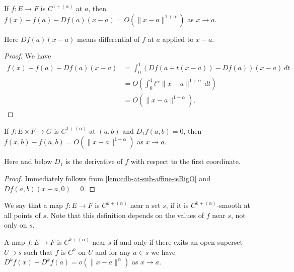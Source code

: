 \begin{lemma}%
  \label{lem:cdh-at-sub-affine-isBigO}
  If \(f\colon E \to F\) is \(C^{1+(\alpha)}\) at \(a\),
  then \(f(x) - f(a) - Df(a)(x - a) = O\left(\|x - a\|^{1 + \alpha}\right)\) as \(x \to a\).
\end{lemma}
Here \(Df(a)(x - a)\) means differential of \(f\) at \(a\) applied to \(x - a\).

\begin{proof}
  We have
  \begin{align*}
    f(x) - f(a) - Df(a)(x - a) &= \int_{0}^{1}\left(Df(a + t(x - a)) - Df(a)\right)(x - a)\,dt\\
                               &= O\left(\int_{0}^{1}t^{\alpha}\|x - a\|^{1+\alpha}\,dt\right)\\
                               &= O\left(\|x - a\|^{1 + \alpha}\right).
  \end{align*}
\end{proof}

\begin{corollary}%
  \label{cor:cdh-at-sub-isBigO}
  If \(f\colon E \times F \to G\) is \(C^{1+(\alpha)}\) at \((a, b)\) and \(D_{1}f(a, b) = 0\),
  then \(f(x, b) - f(a, b) = O\left(\|x - a\|^{1 + \alpha}\right)\) as \(x \to a\).
\end{corollary}
Here and below \(D_{1}\) is the derivative of \(f\) with respect to the first coordinate.

\begin{proof}
  Immediately follows from \autoref{lem:cdh-at-sub-affine-isBigO} and \(Df(a, b)(x - a, 0) = 0\).
\end{proof}

\begin{definition}%
  \label{def:cdh-near}
  We say that a map \(f\colon E\to F\) is \emph{\(C^{k+(\alpha)}\)} near a set \(s\),
  if it is \(C^{k+(\alpha)}\)-smooth at all points of \(s\).
  Note that this definition depends on the values of \(f\) near \(s\), not only on \(s\).
\end{definition}

\begin{lemma}%
  \label{lem:cdh-on-nhds-iff-open}
  A map \(f\colon E\to F\) is \(C^{k+(\alpha)}\) near \(s\)
  if and only if there exits an open superset \(U\supset s\)
  such that \(f\) is \(C^{k}\) on \(U\)
  and for any \(a \in s\) we have \(D^{k}f(x) - D^{k}f(a) = o(\|x - a\|^{\alpha})\) as \(x\to a\).
\end{lemma}

